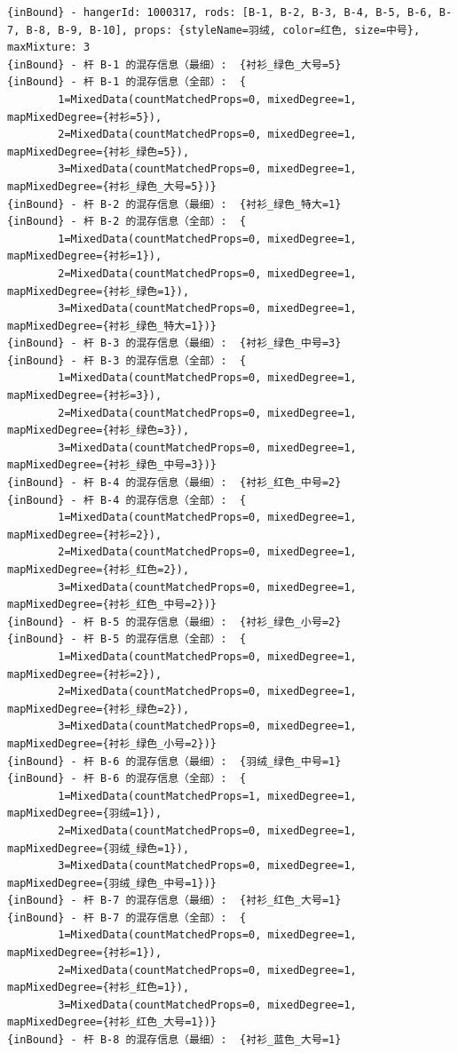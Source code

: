 {\begin{verbatim}
{inBound} - hangerId: 1000317, rods: [B-1, B-2, B-3, B-4, B-5, B-6, B-7, B-8, B-9, B-10], props: {styleName=羽绒, color=红色, size=中号}, maxMixture: 3
{inBound} - 杆 B-1 的混存信息（最细）:  {衬衫_绿色_大号=5}
{inBound} - 杆 B-1 的混存信息（全部）:  {
		1=MixedData(countMatchedProps=0, mixedDegree=1, mapMixedDegree={衬衫=5}), 
		2=MixedData(countMatchedProps=0, mixedDegree=1, mapMixedDegree={衬衫_绿色=5}), 
		3=MixedData(countMatchedProps=0, mixedDegree=1, mapMixedDegree={衬衫_绿色_大号=5})}
{inBound} - 杆 B-2 的混存信息（最细）:  {衬衫_绿色_特大=1}
{inBound} - 杆 B-2 的混存信息（全部）:  {
		1=MixedData(countMatchedProps=0, mixedDegree=1, mapMixedDegree={衬衫=1}), 
		2=MixedData(countMatchedProps=0, mixedDegree=1, mapMixedDegree={衬衫_绿色=1}), 
		3=MixedData(countMatchedProps=0, mixedDegree=1, mapMixedDegree={衬衫_绿色_特大=1})}
{inBound} - 杆 B-3 的混存信息（最细）:  {衬衫_绿色_中号=3}
{inBound} - 杆 B-3 的混存信息（全部）:  {
		1=MixedData(countMatchedProps=0, mixedDegree=1, mapMixedDegree={衬衫=3}), 
		2=MixedData(countMatchedProps=0, mixedDegree=1, mapMixedDegree={衬衫_绿色=3}), 
		3=MixedData(countMatchedProps=0, mixedDegree=1, mapMixedDegree={衬衫_绿色_中号=3})}
{inBound} - 杆 B-4 的混存信息（最细）:  {衬衫_红色_中号=2}
{inBound} - 杆 B-4 的混存信息（全部）:  {
		1=MixedData(countMatchedProps=0, mixedDegree=1, mapMixedDegree={衬衫=2}), 
		2=MixedData(countMatchedProps=0, mixedDegree=1, mapMixedDegree={衬衫_红色=2}), 
		3=MixedData(countMatchedProps=0, mixedDegree=1, mapMixedDegree={衬衫_红色_中号=2})}
{inBound} - 杆 B-5 的混存信息（最细）:  {衬衫_绿色_小号=2}
{inBound} - 杆 B-5 的混存信息（全部）:  {
		1=MixedData(countMatchedProps=0, mixedDegree=1, mapMixedDegree={衬衫=2}), 
		2=MixedData(countMatchedProps=0, mixedDegree=1, mapMixedDegree={衬衫_绿色=2}), 
		3=MixedData(countMatchedProps=0, mixedDegree=1, mapMixedDegree={衬衫_绿色_小号=2})}
{inBound} - 杆 B-6 的混存信息（最细）:  {羽绒_绿色_中号=1}
{inBound} - 杆 B-6 的混存信息（全部）:  {
		1=MixedData(countMatchedProps=1, mixedDegree=1, mapMixedDegree={羽绒=1}), 
		2=MixedData(countMatchedProps=0, mixedDegree=1, mapMixedDegree={羽绒_绿色=1}), 
		3=MixedData(countMatchedProps=0, mixedDegree=1, mapMixedDegree={羽绒_绿色_中号=1})}
{inBound} - 杆 B-7 的混存信息（最细）:  {衬衫_红色_大号=1}
{inBound} - 杆 B-7 的混存信息（全部）:  {
		1=MixedData(countMatchedProps=0, mixedDegree=1, mapMixedDegree={衬衫=1}), 
		2=MixedData(countMatchedProps=0, mixedDegree=1, mapMixedDegree={衬衫_红色=1}), 
		3=MixedData(countMatchedProps=0, mixedDegree=1, mapMixedDegree={衬衫_红色_大号=1})}
{inBound} - 杆 B-8 的混存信息（最细）:  {衬衫_蓝色_大号=1}

\end{verbatim}}

